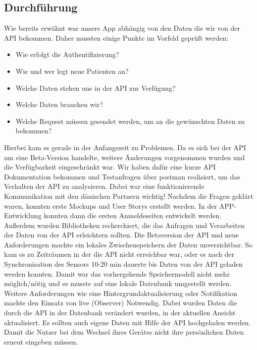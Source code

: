 \subsection{Durchführung}\label{durchführung}
Wie bereits erwähnt war unsere App abhängig von den Daten die wir von der API bekommen. Daher mussten einige Punkte im Vorfeld geprüft werden:
\begin{itemize}\label{stichpunkte}
	\item Wie erfolgt die Authentifizierung?
	\item Wie und wer legt neue Patienten an?
	\item Welche Daten stehen uns in der API zur Verfügung?
	\item Welche Daten brauchen wir?
	\item Welche Request müssen gesendet werden, um an die gewünschten Daten zu bekommen?
\end{itemize}
Hierbei kam es gerade in der Anfangszeit zu Problemen. Da es sich bei der API um eine Beta-Version handelte, weitere Änderungen vorgenommen wurden und die Verfügbarkeit eingeschränkt war.
Wir haben dafür eine kurze API Dokumentation bekommen und Testanfragen über \gls{postman} realisiert, um das Verhalten der API zu analysieren. Dabei war eine funktionierende Kommunikation mit den dänischen Partnern wichtig! 
Nachdem die Fragen geklärt waren, konnten erste Mockups und User Storys erstellt werden. In der APP-Entwicklung konnten dann die ersten Anmeldeseiten entwickelt werden. Außerdem wurden Bibliotheken recherchiert, die das Anfragen und Verarbeiten der Daten von der API erleichtern sollten.
Die Betaversion der  API und neue Anforderungen machte ein lokales Zwischenspeichern der Daten unverzichtbar. So kam es zu Zeiträumen in der die API nicht erreichbar war, oder  es nach der Synchronisation des Sensors 10-20 min dauerte bis  Daten von der API geladen werden konnten.
Damit war das vorhergehende Speichermodell nicht mehr möglich/nötig und es musste auf eine lokale Datenbank umgestellt werden. Weitere Anforderungen wie eine
 Hintergrundaktualisierung oder Notifikation machte den Einsatz von \gls{live}  (Observer) Notwendig. Dabei wurden  Daten die durch die API in der Datenbank verändert wurden,  in der aktuellen Ansicht aktualisiert. Es sollten auch eigene Daten mit Hilfe der API hochgeladen werden. Damit die Nutzer bei dem Wechsel ihres Gerätes nicht  ihre persönlichen Daten erneut eingeben müssen.
